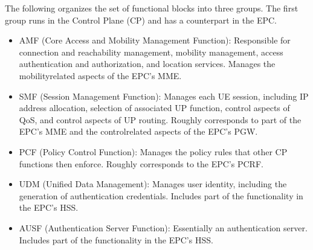 \documentclass[a4paper,11pt,english]{sphinxmanual}
\begin{document}
\sphinxAtStartPar
The following organizes the set of functional blocks into three groups.
The first group runs in the Control Plane (CP) and has a counterpart in
the EPC.
\begin{itemize}
\item {} 
\sphinxAtStartPar
AMF (Core Access and Mobility Management Function): Responsible for connection
and reachability management, mobility management, access
authentication and authorization, and location services. Manages the
mobility\sphinxhyphen{}related aspects of the EPC’s MME.

\item {} 
\sphinxAtStartPar
SMF (Session Management Function): Manages each UE session, including
IP address allocation, selection of associated UP function, control
aspects of QoS, and control aspects of UP routing. Roughly
corresponds to part of the EPC’s MME and the control\sphinxhyphen{}related aspects
of the EPC’s PGW.

\item {} 
\sphinxAtStartPar
PCF (Policy Control Function): Manages the policy rules that other CP
functions then enforce. Roughly corresponds to the EPC’s PCRF.

\item {} 
\sphinxAtStartPar
UDM (Unified Data Management): Manages user identity, including the
generation of authentication credentials. Includes part of the
functionality in the EPC’s HSS.

\item {} 
\sphinxAtStartPar
AUSF (Authentication Server Function): Essentially an authentication
server. Includes part of the functionality in the EPC’s HSS.

\end{itemize}
\end{document}
